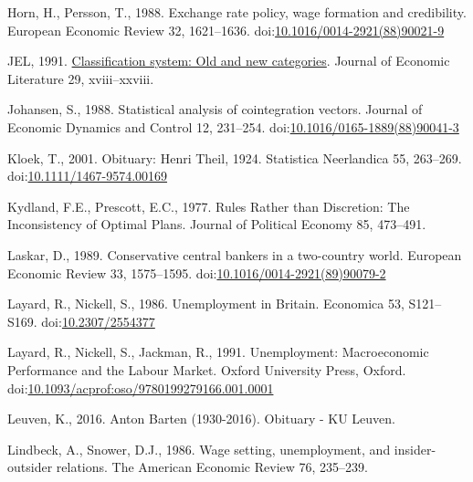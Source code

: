 \documentclass[
  12pt,
  onecolumn]{article}
\newlength{\cslhangindent}
\newlength{\cslentryspacingunit} %
\newenvironment{CSLReferences}[2] %
 {%
  \setlength{\parindent}{0pt}
  \ifodd #1
  \let\oldpar\par
  \def\par{\hangindent=\cslhangindent\oldpar}
  \fi
  \setlength{\parskip}{#2\cslentryspacingunit}
 }%
 {}
\begin{document}
\begin{CSLReferences}{1}{0}
\leavevmode{}%
Horn, H., Persson, T., 1988. Exchange rate policy, wage formation and
credibility. European Economic Review 32, 1621--1636.
doi:\href{https://doi.org/10.1016/0014-2921(88)90021-9}{10.1016/0014-2921(88)90021-9}

\leavevmode{}%
JEL, 1991. \href{https://www.jstor.org/stable/2727351}{Classification
system: Old and new categories}. Journal of Economic Literature 29,
xviii--xxviii.

\leavevmode{}%
Johansen, S., 1988. Statistical analysis of cointegration vectors.
Journal of Economic Dynamics and Control 12, 231--254.
doi:\href{https://doi.org/10.1016/0165-1889(88)90041-3}{10.1016/0165-1889(88)90041-3}

\leavevmode{}%
Kloek, T., 2001. Obituary: {Henri Theil}, 1924.
Statistica Neerlandica 55, 263--269.
doi:\href{https://doi.org/10.1111/1467-9574.00169}{10.1111/1467-9574.00169}

\leavevmode{}%
Kydland, F.E., Prescott, E.C., 1977. Rules {Rather} than {Discretion}:
{The Inconsistency} of {Optimal Plans}. Journal of Political Economy 85,
473--491.

\leavevmode{}%
Laskar, D., 1989. Conservative central bankers in a two-country world.
European Economic Review 33, 1575--1595.
doi:\href{https://doi.org/10.1016/0014-2921(89)90079-2}{10.1016/0014-2921(89)90079-2}

\leavevmode{}%
Layard, R., Nickell, S., 1986. Unemployment in {Britain}. Economica 53,
S121--S169. doi:\href{https://doi.org/10.2307/2554377}{10.2307/2554377}

\leavevmode{}%
Layard, R., Nickell, S., Jackman, R., 1991. Unemployment: {Macroeconomic
Performance} and the {Labour Market}. {Oxford University Press},
{Oxford}.
doi:\href{https://doi.org/10.1093/acprof:oso/9780199279166.001.0001}{10.1093/acprof:oso/9780199279166.001.0001}

\leavevmode{}%
Leuven, K., 2016. Anton {Barten} (1930-2016). Obituary - KU Leuven.

\leavevmode{}%
Lindbeck, A., Snower, D.J., 1986. Wage setting, unemployment, and
insider-outsider relations. The American Economic Review 76, 235--239.


\end{CSLReferences}
\end{document}
